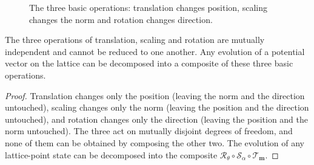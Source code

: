 \begin{figure}[htbp]
\centering
{}
\caption{The three basic operations: translation changes position, scaling changes the norm and rotation changes direction.}
\label{fig:lattice_operations}
\end{figure}

\begin{proposition}\label{prop:lattice_operations_irreducibility}
The three operations of translation, scaling and rotation are mutually independent and cannot be reduced to one another. Any evolution of a potential vector on the lattice can be decomposed into a composite of these three basic operations.
\end{proposition}

\begin{proof}
Translation changes only the position (leaving the norm and the direction untouched), scaling changes only the norm (leaving the position and the direction untouched), and rotation changes only the direction (leaving the position and the norm untouched). The three act on mutually disjoint degrees of freedom, and none of them can be obtained by composing the other two. The evolution of any lattice-point state can be decomposed into the composite $\mathcal{R}_\theta\circ\mathcal{S}_\alpha\circ\mathcal{T}_{\mathbf{m}}$.
\end{proof}

